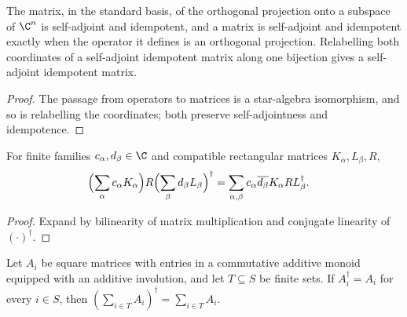 \begin{lemma}
    \label{lem:star_projection_matrices}
    \leanok
    The matrix, in the standard basis, of the orthogonal projection onto a
    subspace of $\C^n$ is self-adjoint and idempotent, and a matrix is
    self-adjoint and idempotent exactly when the operator it defines is an
    orthogonal projection. Relabelling both
    coordinates of a self-adjoint idempotent matrix along one bijection gives
    a self-adjoint idempotent matrix.
\end{lemma}

\begin{proof}\leanok
    The passage from operators to matrices is a star-algebra isomorphism, and
    so is relabelling the coordinates; both preserve self-adjointness and
    idempotence.
\end{proof}

\begin{lemma}
    \label{thm:peps_weighted_density_sum}
    \leanok
    For finite families $c_\alpha,d_\beta\in\C$ and compatible rectangular
    matrices $K_\alpha,L_\beta,R$,
    \begin{align}
        \Bigl(\sum_\alpha c_\alpha K_\alpha\Bigr)R
        \Bigl(\sum_\beta d_\beta L_\beta\Bigr)^\dagger
         & =\sum_{\alpha,\beta}c_\alpha\overline{d_\beta}
        K_\alpha R L_\beta^\dagger.
        \label{eq:peps_weighted_density_sum}
    \end{align}
\end{lemma}

\begin{proof}\leanok
    Expand by bilinearity of matrix multiplication and conjugate linearity of
    $(\cdot)^\dagger$.
\end{proof}

\begin{lemma}
    \label{thm:hermitian_partial_sums}
    \leanok
    Let $A_i$ be square matrices with entries in a commutative additive monoid
    equipped with an additive involution, and let $T\subseteq S$ be finite sets.
    If $A_i^\dagger=A_i$ for every $i\in S$, then
    $(\sum_{i\in T}A_i)^\dagger=\sum_{i\in T}A_i$.
\end{lemma}

